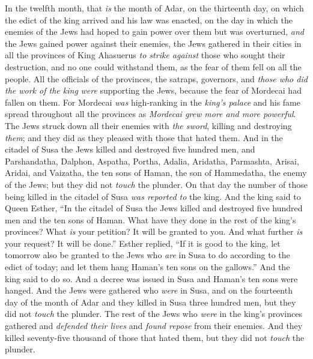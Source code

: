 \begin{biblechapter} %
 In the twelfth month, that \textit{is} the month of Adar, on the thirteenth day, on which the edict of the king arrived and his law was enacted, on the day in which the enemies of the Jews had hoped to gain power over them but was overturned, \textit{and} the Jews gained power against their enemies,
\verse the Jews gathered in their cities in all the provinces of King Ahasuerus \textit{to strike against} those who sought their destruction, and no one could withstand them, as the fear of them fell on all the people.
\verse All the officials of the provinces, the satraps, governors, and \textit{those who did the work of the king} \textit{were} supporting the Jews, because the fear of Mordecai had fallen on them.
\verse For Mordecai \textit{was} high-ranking in the \textit{king’s palace} and his fame spread throughout all the provinces as \textit{Mordecai grew more and more powerful}.
\verse The Jews struck down all their enemies with \textit{the sword}, killing and destroying \textit{them}; and they did as they pleased with those that hated them.
\verse And in the citadel of Susa the Jews killed and destroyed five hundred men,
\verse and Parshandatha, Dalphon, Aspatha,
\verse Portha, Adalia, Aridatha,
\verse Parmashta, Arisai, Aridai, and Vaizatha,
\verse the ten sons of Haman, the son of Hammedatha, the enemy of the Jews; but they did not \textit{touch} the plunder.
\verse On that day the number of those being killed in the citadel of Susa \textit{was reported to} the king.
\verse And the king said to Queen Esther, “In the citadel of Susa the Jews killed and destroyed five hundred men and the ten sons of Haman. What have they done in the rest of the king’s provinces? What \textit{is} your petition? It will be granted to you. And what further \textit{is} your request? It will be done.”
\verse Esther replied, “If it is good to the king, let tomorrow also be granted to the Jews who \textit{are} in Susa to do according to the edict of today; and let them hang Haman’s ten sons on the gallows.”
\verse And the king said to do so. And a decree was issued in Susa and Haman’s ten sons were hanged.
\verse And the Jews were gathered who \textit{were} in Susa, and on the fourteenth day of the month of Adar and they killed in Susa three hundred men, but they did not \textit{touch} the plunder.
\verse The rest of the Jews who \textit{were} in the king’s provinces gathered and \textit{defended their lives} and \textit{found repose} from their enemies. And they killed seventy-five thousand of those that hated them, but they did not \textit{touch} the plunder.

\end{biblechapter}
